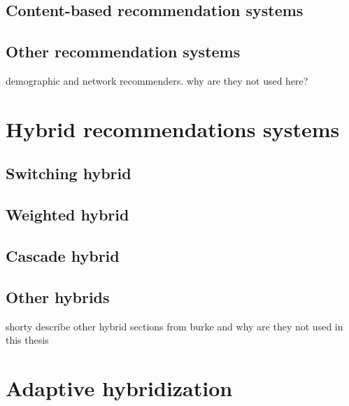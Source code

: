 \documentclass[10pt]{reportMaster}
\begin{document}
\section{Content-based recommendation systems} %
 
\section{Other recommendation systems}
demographic and network recommenders.
why are they not used here?










\chapter{Hybrid recommendations systems}

\section{Switching hybrid}

\section{Weighted hybrid}

\section{Cascade hybrid}

\section{Other hybrids}
shorty describe other hybrid sections from burke and why are they not used in this thesis







\chapter{Adaptive hybridization}
\end{document}
